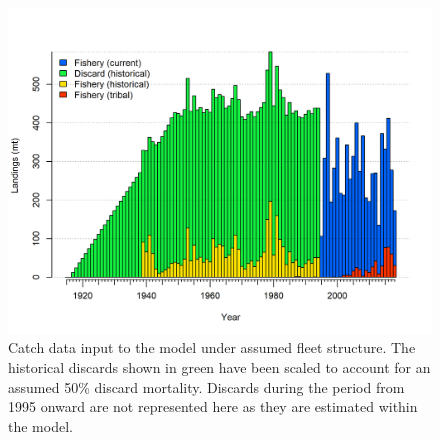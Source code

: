 \documentclass[12pt,]{article}
\begin{document}
\begin{figure}
\centering
\includegraphics{r4ss/plots_mod1/catch2 landings stacked.png}
\caption{Catch data input to the model under assumed fleet structure.
The historical discards shown in green have been scaled to account for
an assumed 50\% discard mortality. Discards during the period from 1995
onward are not represented here as they are estimated within the model.
\label{fig:catch_input_plot}}
\end{figure}

\FloatBarrier
\end{document}
